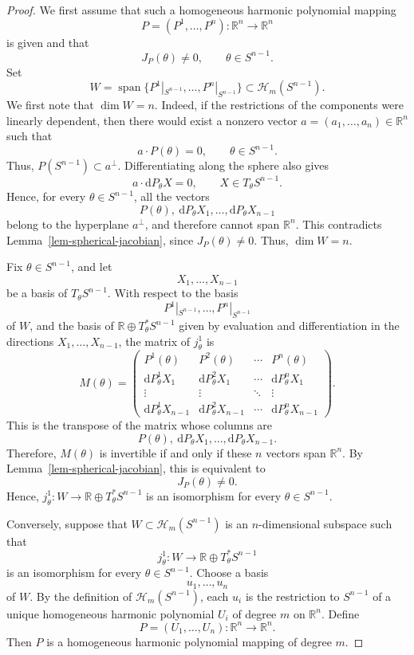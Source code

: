 \documentclass[10pt]{amsart}
\numberwithin{equation}{section}
\theoremstyle{definition}
\DeclareMathOperator{\spanop}{span}
\newcommand{\R}{\mathbb R}
\begin{document}
\begin{proof}
We first assume that such a homogeneous harmonic polynomial mapping
\[
        P=(P^1,\ldots,P^n):\R^n\to\R^n
\]
is given and that
\[
        J_P(\theta)\ne0,
        \qquad
        \theta\in S^{n-1}.
\]
Set
\[
        W=\spanop\{P^1|_{S^{n-1}},\ldots,P^n|_{S^{n-1}}\}
        \subset \mathcal H_m(S^{n-1}).
\]
We first note that \(\dim W=n\). Indeed, if the restrictions of the
components were linearly dependent, then there would exist a nonzero vector
\(a=(a_1,\ldots,a_n)\in\R^n\) such that
\[
        a\cdot P(\theta)=0,
        \qquad
        \theta\in S^{n-1}.
\]
Thus, \(P(S^{n-1})\subset a^\perp\). Differentiating along the sphere also
gives
\[
        a\cdot \mathrm{d}P_\theta X=0,
        \qquad
        X\in T_\theta S^{n-1}.
\]
Hence, for every \(\theta\in S^{n-1}\), all the vectors
\[
        P(\theta),\ \mathrm{d}P_\theta X_1,\ldots,\mathrm{d}P_\theta X_{n-1}
\]
belong to the hyperplane \(a^\perp\), and therefore cannot span \(\R^n\).
This contradicts Lemma~\ref{lem-spherical-jacobian}, since \(J_P(\theta)\ne0\).
Thus, \(\dim W=n\).

Fix \(\theta\in S^{n-1}\), and let
\[
        X_1,\ldots,X_{n-1}
\]
be a basis of \(T_\theta S^{n-1}\). With respect to the basis
\[
        P^1|_{S^{n-1}},\ldots,P^n|_{S^{n-1}}
\]
of \(W\), and the basis of \(\R\oplus T^*_\theta S^{n-1}\) given by
evaluation and differentiation in the directions \(X_1,\ldots,X_{n-1}\), the
matrix of \(j^1_\theta\) is
\[
        M(\theta)=
        \begin{pmatrix}
        P^1(\theta) & P^2(\theta) & \cdots & P^n(\theta)\\
        \mathrm{d}P^1_\theta X_1 & \mathrm{d}P^2_\theta X_1 & \cdots & \mathrm{d}P^n_\theta X_1\\
        \vdots & \vdots & \ddots & \vdots\\
        \mathrm{d}P^1_\theta X_{n-1} & \mathrm{d}P^2_\theta X_{n-1}
        & \cdots & \mathrm{d}P^n_\theta X_{n-1}
        \end{pmatrix}.
\]
This is the transpose of the matrix whose columns are
\[
        P(\theta),\ \mathrm{d}P_\theta X_1,\ldots,\mathrm{d}P_\theta X_{n-1}.
\]
Therefore, \(M(\theta)\) is invertible if and only if these \(n\) vectors span
\(\R^n\). By Lemma~\ref{lem-spherical-jacobian}, this is equivalent to
\[
        J_P(\theta)\ne0.
\]
Hence, \(j^1_\theta:W\to\R\oplus T^*_\theta S^{n-1}\) is an isomorphism for
every \(\theta\in S^{n-1}\).

Conversely, suppose that \(W\subset\mathcal H_m(S^{n-1})\) is an
\(n\)-dimensional subspace such that
\[
        j^1_\theta:W\to\R\oplus T^*_\theta S^{n-1}
\]
is an isomorphism for every \(\theta\in S^{n-1}\). Choose a basis
\[
        u_1,\ldots,u_n
\]
of \(W\). By the definition of \(\mathcal H_m(S^{n-1})\), each \(u_i\) is the
restriction to \(S^{n-1}\) of a unique homogeneous harmonic polynomial
\(U_i\) of degree \(m\) on \(\R^n\). Define
\[
        P=(U_1,\ldots,U_n):\R^n\to\R^n.
\]
Then \(P\) is a homogeneous harmonic polynomial mapping of degree \(m\).


\end{proof}
\end{document}
